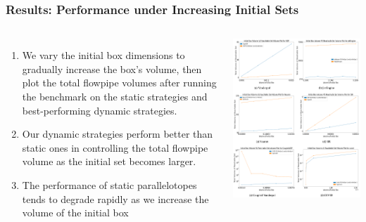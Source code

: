 \documentclass{beamer}
\begin{document}
\begin{frame}
  \frametitle{\textbf{Results:}  Performance under Increasing Initial Sets}
  \begin{columns}
      \footnotesize
      \begin{enumerate}
        \item We vary the initial box dimensions to gradually increase the box's volume, then plot the total flowpipe volumes after running the benchmark on the static strategies and best-performing dynamic strategies.
        \item Our dynamic strategies perform better than static ones in controlling the total flowpipe volume as the initial set becomes larger.
        \item The performance of static parallelotopes tends to degrade rapidly as we increase the volume of the initial box
      \end{enumerate}

      \includegraphics[width=1.1\textwidth]{sapoinitplots}
  \end{columns}
\end{frame}
\end{document}
